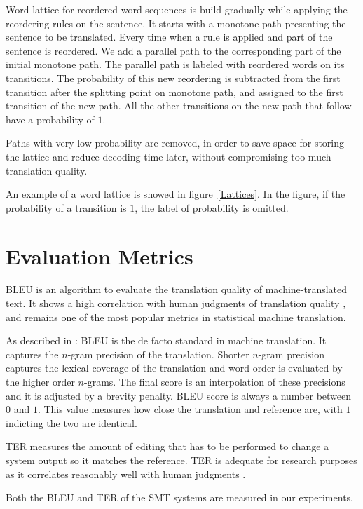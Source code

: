 Word lattice for reordered word sequences is build gradually while applying the reordering rules on the sentence. It starts with a monotone path presenting the sentence to be translated. Every time when a rule is applied and part of the sentence is reordered. We add a parallel path to the corresponding part of the initial monotone path. The parallel path is labeled with reordered words on its transitions. The probability of this new reordering is subtracted from the first transition after the splitting point on monotone path, and assigned to the first transition of the new path. All the other transitions on the new path that follow have a probability of $1$.

Paths with very low probability are removed, in order to save space for storing the lattice and reduce decoding time later, without compromising too much translation quality. 

An example of a word lattice is showed in figure~\ref{Lattices}. In the figure, if the probability of a transition is $1$, the label of probability is omitted.

\section{Evaluation Metrics}
\label{ch:Foundations:sec:bleu}

\ac{BLEU} is an algorithm to evaluate the translation quality of machine-translated text. It shows a high correlation with human judgments of translation quality \citep{bleuscore}, and remains one of the most popular metrics in statistical machine translation.

As described in \cite{metrics}: \ac{BLEU} is the de facto standard in machine translation. It captures the $n$-gram precision of the translation. Shorter $n$-gram precision captures the lexical coverage of the translation and word order is evaluated by the higher order $n$-grams. The final score is an interpolation of these precisions and it is adjusted by a brevity penalty. \ac{BLEU} score is always a number between $0$ and $1$. This value measures how close the translation and reference are, with $1$ indicting the two are identical.

\ac{TER} measures the amount of editing that has to be performed to change a system output so it matches the reference. \ac{TER} is adequate for research purposes as it correlates reasonably well with human judgments \citep{snover2006study}.

Both the \ac{BLEU} and \ac{TER} of the \ac{SMT} systems are measured in our experiments.

